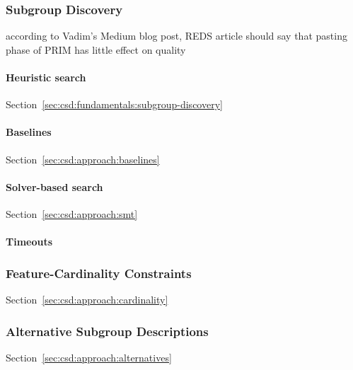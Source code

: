 \documentclass{article}
\theoremstyle{definition}
\begin{document}
\subsubsection{Subgroup Discovery}
\label{sec:csd:experimental-design:methods:subgroup-discovery}

according to Vadim's Medium blog post, REDS article should say that pasting phase of PRIM has little effect on quality

\cite{lemmerich2019pysubgroup}
\cite{arzamasov2021reds}

\paragraph{Heuristic search}

Section~\ref{sec:csd:fundamentals:subgroup-discovery}

\paragraph{Baselines}

Section~\ref{sec:csd:approach:baselines}

\paragraph{Solver-based search}

Section~\ref{sec:csd:approach:smt}

\paragraph{Timeouts}

\subsubsection{Feature-Cardinality Constraints}
\label{sec:csd:experimental-design:methods:cardinality}

Section~\ref{sec:csd:approach:cardinality}

\subsubsection{Alternative Subgroup Descriptions}
\label{sec:csd:experimental-design:methods:alternatives}

Section~\ref{sec:csd:approach:alternatives}
\end{document}

